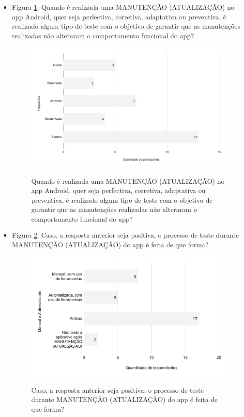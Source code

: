 \begin{itemize}
    
    \item Figura \ref{figure:s_testemanutencao}: Quando é realizada uma MANUTENÇÃO (ATUALIZAÇÃO) no app Android, quer seja perfectiva, corretiva, adaptativa ou preventiva, é realizado algum tipo de teste com o objetivo de garantir que as manutenções realizadas não alteraram o comportamento funcional do app?
    \begin{figure}[!htb]
    \centering
    \includegraphics[width=.80\textwidth]{images/s_testemanutencao.png}
    \label{figure:s_testemanutencao}
    \caption{Quando é realizada uma MANUTENÇÃO (ATUALIZAÇÃO) no app Android, quer seja perfectiva, corretiva, adaptativa ou preventiva, é realizado algum tipo de teste com o objetivo de garantir que as manutenções realizadas não alteraram o comportamento funcional do app?}
    \end{figure}   
    
    
    \item Figura \ref{figure:s_formatestemanutencao}: Caso, a resposta anterior seja positiva, o processo de teste durante MANUTENÇÃO (ATUALIZAÇÃO) do app é feita de que forma?
    \begin{figure}[!htb]
    \centering
    \includegraphics[width=.80\textwidth]{images/s_formatestemanutencao.png}
    \label{figure:s_formatestemanutencao}
    \caption{Caso, a resposta anterior seja positiva, o processo de teste durante MANUTENÇÃO (ATUALIZAÇÃO) do app é feita de que forma?}
    \end{figure}     
    

\end{itemize}

